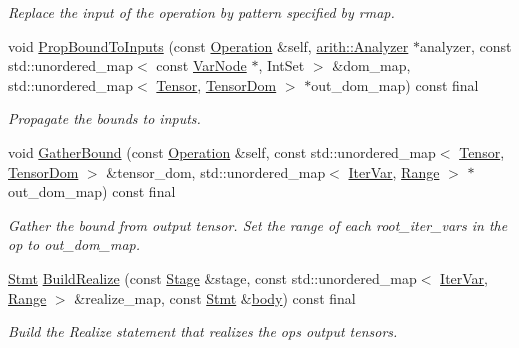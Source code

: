 \begin{DoxyCompactItemize}
\begin{DoxyCompactList}\small\item\em Replace the input of the operation by pattern specified by rmap. \end{DoxyCompactList}\item 
void \hyperlink{classtvm_1_1te_1_1ExternOpNode_ab6976ded9159bd1930030b7196e6568f}{Prop\+Bound\+To\+Inputs} (const \hyperlink{classtvm_1_1te_1_1Operation}{Operation} \&self, \hyperlink{classtvm_1_1arith_1_1Analyzer}{arith\+::\+Analyzer} $\ast$analyzer, const std\+::unordered\+\_\+map$<$ const \hyperlink{classtvm_1_1tir_1_1VarNode}{Var\+Node} $\ast$, Int\+Set $>$ \&dom\+\_\+map, std\+::unordered\+\_\+map$<$ \hyperlink{classtvm_1_1te_1_1Tensor}{Tensor}, \hyperlink{structtvm_1_1te_1_1TensorDom}{Tensor\+Dom} $>$ $\ast$out\+\_\+dom\+\_\+map) const final
\begin{DoxyCompactList}\small\item\em Propagate the bounds to inputs. \end{DoxyCompactList}\item 
void \hyperlink{classtvm_1_1te_1_1ExternOpNode_aa85d67532d24a69b0eec476fc7fec03f}{Gather\+Bound} (const \hyperlink{classtvm_1_1te_1_1Operation}{Operation} \&self, const std\+::unordered\+\_\+map$<$ \hyperlink{classtvm_1_1te_1_1Tensor}{Tensor}, \hyperlink{structtvm_1_1te_1_1TensorDom}{Tensor\+Dom} $>$ \&tensor\+\_\+dom, std\+::unordered\+\_\+map$<$ \hyperlink{classtvm_1_1tir_1_1IterVar}{Iter\+Var}, \hyperlink{classtvm_1_1Range}{Range} $>$ $\ast$out\+\_\+dom\+\_\+map) const final
\begin{DoxyCompactList}\small\item\em Gather the bound from output tensor. Set the range of each root\+\_\+iter\+\_\+vars in the op to out\+\_\+dom\+\_\+map. \end{DoxyCompactList}\item 
\hyperlink{classtvm_1_1tir_1_1Stmt}{Stmt} \hyperlink{classtvm_1_1te_1_1ExternOpNode_ab5155b645767085f9fd499144c30ae1d}{Build\+Realize} (const \hyperlink{classtvm_1_1te_1_1Stage}{Stage} \&stage, const std\+::unordered\+\_\+map$<$ \hyperlink{classtvm_1_1tir_1_1IterVar}{Iter\+Var}, \hyperlink{classtvm_1_1Range}{Range} $>$ \&realize\+\_\+map, const \hyperlink{classtvm_1_1tir_1_1Stmt}{Stmt} \&\hyperlink{classtvm_1_1te_1_1ExternOpNode_a962b2cfaa4a2141c1b9247ac634b7bf2}{body}) const final
\begin{DoxyCompactList}\small\item\em Build the Realize statement that realizes the op\textquotesingle{}s output tensors. \end{DoxyCompactList}\item 

\end{DoxyCompactItemize}
